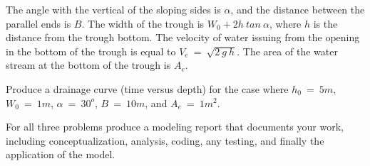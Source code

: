 \documentclass[12pt]{article}
\begin{document}
\begin{enumerate}
The angle with the vertical of the sloping sides is $\alpha$, and the distance between the parallel ends is $B$.  The width of the trough is $W_0 + 2h~tan~\alpha$, where $h$ is the distance from the trough bottom.  The velocity of water issuing from the opening in the bottom of the trough is equal to $V_e~=~\sqrt{2~g~h}$.  The area of the water stream at the bottom of the trough is $A_e$.  

Produce a drainage curve (time versus depth) for the case where $h_0~=~5m$, $W_0~=~1m$, $\alpha~=~30^o$, $B~=~10m$, and $A_e~=~1m^2$.

\end{enumerate}

For all three problems produce a modeling report that documents your work, including conceptualization, analysis, coding, any testing, and finally the application of the model.  
\end{document}
